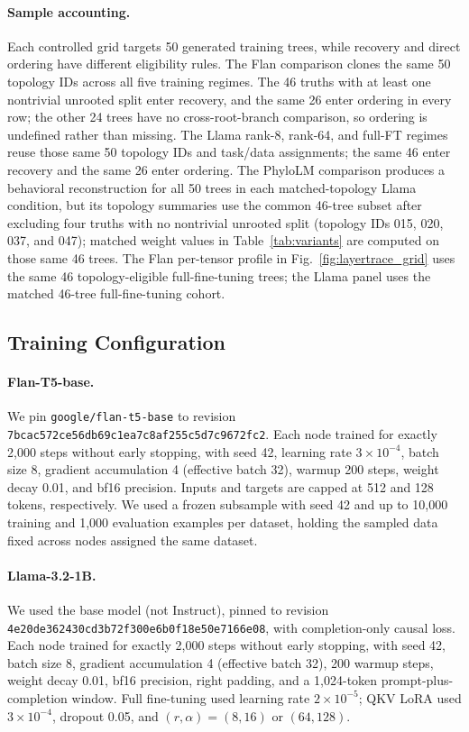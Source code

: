 \documentclass{article}
\theoremstyle{definition}
\theoremstyle{plain}
\begin{document}
\paragraph{Sample accounting.} Each controlled grid targets 50 generated training trees, while
recovery and direct ordering have different eligibility rules. The Flan comparison clones the
same 50 topology IDs across all five training regimes. The 46 truths with at least one nontrivial
unrooted split enter recovery, and the same 26 enter
ordering in every row; the other 24 trees have no cross-root-branch comparison, so ordering is
undefined rather than missing. The Llama rank-8, rank-64, and full-FT regimes reuse those same
50 topology IDs and task/data assignments; the same 46 enter recovery and the same 26 enter ordering.
The PhyloLM comparison produces a behavioral reconstruction for all 50 trees in each matched-topology Llama condition, but its
topology summaries use the common 46-tree subset after excluding four truths with no nontrivial
unrooted split (topology IDs 015, 020, 037, and 047); matched weight values in
Table~\ref{tab:variants} are computed on those same 46 trees.
The Flan per-tensor profile in Fig.~\ref{fig:layertrace_grid} uses the same 46 topology-eligible
full-fine-tuning trees; the Llama panel uses the matched 46-tree
full-fine-tuning cohort.

\subsection*{Training Configuration}
\paragraph{Flan-T5-base.} We pin \texttt{google/flan-t5-base} to revision \texttt{7bcac572ce56\allowbreak db69c1ea7c8a\allowbreak f255c5d7c9672fc2}. Each node trained for exactly 2,000 steps without early stopping, with seed 42, learning rate $3 \times 10^{-4}$, batch size 8, gradient accumulation 4 (effective batch 32), warmup 200 steps, weight decay 0.01, and bf16 precision. Inputs and targets are capped at 512 and 128 tokens, respectively. We used a frozen subsample with seed 42 and up to 10,000 training and 1,000 evaluation examples per dataset, holding the sampled data fixed across nodes assigned the same dataset.

\paragraph{Llama-3.2-1B.} We used the base model (not Instruct), pinned to revision \texttt{4e20de362430\allowbreak cd3b72f300e6\allowbreak b0f18e50e7166e08}, with completion-only causal loss. Each node trained for exactly 2,000 steps without early stopping, with seed 42, batch size 8, gradient accumulation 4 (effective batch 32), 200 warmup steps, weight decay 0.01, bf16 precision, right padding, and a 1,024-token prompt-plus-completion window. Full fine-tuning used learning rate $2 \times 10^{-5}$; QKV LoRA used $3 \times 10^{-4}$, dropout 0.05, and $(r,\alpha)=(8,16)$ or $(64,128)$.
\end{document}
